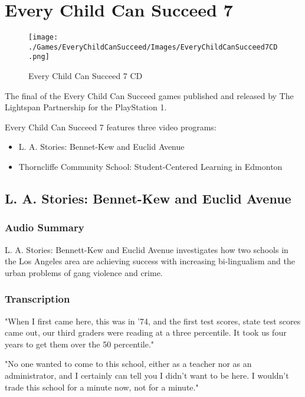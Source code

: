 \chapter{Every Child Can Succeed 7}

\begin{figure}[H]
    \centering
    \texttt{[image: ./Games/EveryChildCanSucceed/Images/EveryChildCanSucceed7CD.png]}
    \caption{Every Child Can Succeed 7 CD}
\end{figure}

The final of the Every Child Can Succeed games published and released by The Lightspan Partnership for the PlayStation 1.

Every Child Can Succeed 7 features three video programs:

\begin{itemize}
    \item L. A. Stories: Bennet-Kew and Euclid Avenue
    \item Thorncliffe Community School: Student-Centered Learning in Edmonton
\end{itemize}

\clearpage
\newpage

\section{L. A. Stories: Bennet-Kew and Euclid Avenue}

\subsection{Audio Summary}

L. A. Stories: Bennett-Kew and Euclid Avenue investigates how two schools in the Los Angeles area are achieving success with increasing bi-lingualism and the urban problems of gang violence and crime.

\subsection{Transcription}

"When I first came here, this was in '74, and the first test scores, state test scores came out, our third graders were reading at a three percentile. It took us four years to get them over the 50 percentile."

"No one wanted to come to this school, either as a teacher nor as an administrator, and I certainly can tell you I didn't want to be here. I wouldn't trade this school for a minute now, not for a minute."

